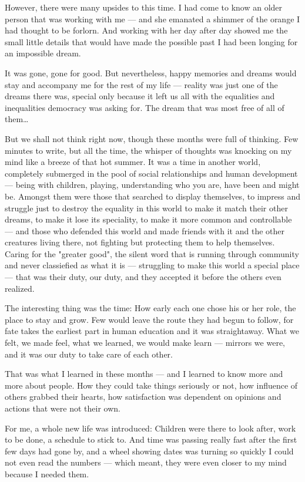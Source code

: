 However, there were many upsides to this time. I had come to know an older person that was working with me --- and she emanated a shimmer of the orange I had thought to be forlorn. And working with her day after day showed me the small little details that would have made the possible past I had been longing for an impossible dream.

It was gone, gone for good. But nevertheless, happy memories and dreams would stay and accompany me for the rest of my life --- reality was just one of the dreams there was, special only because it left us all with the equalities and inequalities democracy was asking for. The dream that was most free of all of them\dots{}

But we shall not think right now, though these months were full of thinking. Few minutes to write, but all the time, the whisper of thoughts was knocking on my mind like a breeze of that hot summer. It was a time in another world, completely submerged in the pool of social relationships and human development --- being with children, playing, understanding who you are, have been and might be. Amongst them were those that searched to display themselves, to impress and struggle just to destroy the equality in this world to make it match their other dreams, to make it lose its speciality, to make it more common and controllable --- and those who defended this world and made friends with it and the other creatures living there, not fighting but protecting them to help themselves. Caring for the "greater good", the silent word that is running through community and never classiefied as what it is --- struggling to make this world a special place --- that was their duty, our duty, and they accepted it before the others even realized.

The interesting thing was the time: How early each one chose his or her role, the place to stay and grow. Few would leave the route they had begun to follow, for fate takes the earliest part in human education and it was straightaway. What we felt, we made feel, what we learned, we would make learn --- mirrors we were, and it was our duty to take care of each other.

That was what I learned in these months --- and I learned to know more and more about people. How they could take things seriously or not, how influence of others grabbed their hearts, how satisfaction was dependent on opinions and actions that were not their own.

For me, a whole new life was introduced: Children were there to look after, work to be done, a schedule to stick to. And time was passing really fast after the first few days had gone by, and a wheel showing dates was turning so quickly I could not even read the numbers --- which meant, they were even closer to my mind because I needed them.

